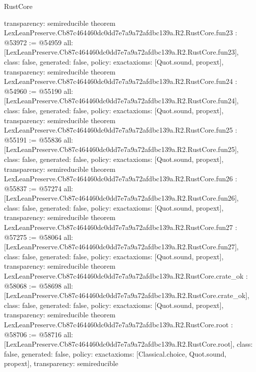 \begin{lexlean}{RustCore}
\begin{coremodule}
{  transparency: semireducible
}
theorem LexLeanPreserve.Cb87c464460dc0dd7e7a9a72afdbc139a.R2.RustCore.fun23 : @53972 := @54959 {
  all: [LexLeanPreserve.Cb87c464460dc0dd7e7a9a72afdbc139a.R2.RustCore.fun23],
  class: false,
  generated: false,
  policy: exact{axioms: [Quot.sound, propext]},
  transparency: semireducible
}
theorem LexLeanPreserve.Cb87c464460dc0dd7e7a9a72afdbc139a.R2.RustCore.fun24 : @54960 := @55190 {
  all: [LexLeanPreserve.Cb87c464460dc0dd7e7a9a72afdbc139a.R2.RustCore.fun24],
  class: false,
  generated: false,
  policy: exact{axioms: [Quot.sound, propext]},
  transparency: semireducible
}
theorem LexLeanPreserve.Cb87c464460dc0dd7e7a9a72afdbc139a.R2.RustCore.fun25 : @55191 := @55836 {
  all: [LexLeanPreserve.Cb87c464460dc0dd7e7a9a72afdbc139a.R2.RustCore.fun25],
  class: false,
  generated: false,
  policy: exact{axioms: [Quot.sound, propext]},
  transparency: semireducible
}
theorem LexLeanPreserve.Cb87c464460dc0dd7e7a9a72afdbc139a.R2.RustCore.fun26 : @55837 := @57274 {
  all: [LexLeanPreserve.Cb87c464460dc0dd7e7a9a72afdbc139a.R2.RustCore.fun26],
  class: false,
  generated: false,
  policy: exact{axioms: [Quot.sound, propext]},
  transparency: semireducible
}
theorem LexLeanPreserve.Cb87c464460dc0dd7e7a9a72afdbc139a.R2.RustCore.fun27 : @57275 := @58064 {
  all: [LexLeanPreserve.Cb87c464460dc0dd7e7a9a72afdbc139a.R2.RustCore.fun27],
  class: false,
  generated: false,
  policy: exact{axioms: [Quot.sound, propext]},
  transparency: semireducible
}
theorem LexLeanPreserve.Cb87c464460dc0dd7e7a9a72afdbc139a.R2.RustCore.crate_ok : @58068 := @58698 {
  all: [LexLeanPreserve.Cb87c464460dc0dd7e7a9a72afdbc139a.R2.RustCore.crate_ok],
  class: false,
  generated: false,
  policy: exact{axioms: [Quot.sound, propext]},
  transparency: semireducible
}
theorem LexLeanPreserve.Cb87c464460dc0dd7e7a9a72afdbc139a.R2.RustCore.root : @58706 := @58716 {
  all: [LexLeanPreserve.Cb87c464460dc0dd7e7a9a72afdbc139a.R2.RustCore.root],
  class: false,
  generated: false,
  policy: exact{axioms: [Classical.choice, Quot.sound, propext]},
  transparency: semireducible
}


\end{coremodule}
\end{lexlean}
